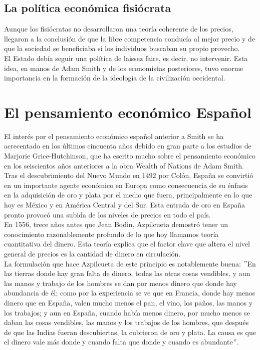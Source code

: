 \documentclass[10pt]{book}
\begin{document}
    \subsection*{La política económica fisiócrata}
    Aunque los fisiócratas no desarrollaron una teoría coherente de los precios, llegaron a la conclusión de que la libre competencia conducía al mejor precio y de que la sociedad se beneficiaba si los individuos buscaban su propio provecho.\\
    El Estado debía seguir una política de laissez faire, es decir, no intervenir. Esta idea, en manos de Adam Smith y de los economistas posteriores, tuvo enorme importancia en la formación de la ideología de la civilización occidental.

\section*{El pensamiento económico Español}
El interés por el pensamiento económico español anterior a Smith se ha acrecentado en los últimos cincuenta años debido en gran parte a los estudios de Marjorie Grice-Hutchinson, que ha escrito mucho sobre el pensamiento económico en los seiscientos años anteriores a la obra Wealth of Nations de Adam Smith.\\
Tras el descubrimiento del Nuevo Mundo en 1492 por Colón, España se convirtió en un importante agente económico en Europa como consecuencia de su énfasis en la adquisición de oro y plata por el medio que fuera, principalmente en lo que hoy es México y en América Central y del Sur. Esta entrada de oro en España pronto provocó una subida de los niveles de precios en todo el país.\\
En 1556, trece años antes que Jean Bodin, Azpilcueta demostró tener un conocimiento razonablemente profundo de lo que hoy llamamos teoría cuantitativa del dinero. Esta teoría explica que el factor clave que altera el nivel general de precios es la cantidad de dinero en circulación.\\ 
La formulación que hace Azpilcueta de este principio es notablemente buena: $"$En las tierras donde hay gran falta de dinero, todas las otras cosas vendibles, y aun las manos y trabajo de los hombres se dan por menos dinero que donde hay abundancia de él; como por la experiencia se ve que en Francia, donde hay menos dinero que en España, valen mucho menos el pan, el vino, los paños, las manos y los trabajos; y aun en España, cuando había menos dinero, por mucho menos se daban las cosas vendibles, las manos y los trabajos de los hombres, que después de que las Indias fueran descubiertas, la cubrieron de oro y plata. La causa es que el dinero vale más donde y cuando falta que donde y cuando es abundante$"$.\\
\end{document}
